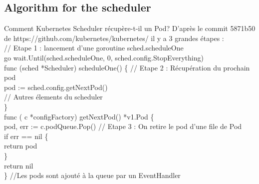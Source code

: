 \documentclass{bredelebeamer}
\begin{document}
\subsection{Algorithm for the scheduler}
\begin{frame}{Comment Kubernetes Scheduler récupère-t-il un Pod?}
D'après le commit 5871b50 de https://github.com/kubernetes/kubernetes/ il y a 3 grandes étapes : 
\vspace{10px} \\

\textcolor{Framavert}{// Etape 1 : lancement d'une goroutine sched.scheduleOne\\}
\textcolor{Framarouge}{go} wait.\textcolor{Framableu}{Until}(sched.scheduleOne, \textcolor{Framableu}{0}, sched.config.StopEverything) \pause
\vspace{10px}\\
\textcolor{Framarouge}{func }\textcolor{Framaviolet}{(}\textcolor{Framaorange}{sched }\textcolor{Framaviolet}{*}\textcolor{Framaorange}{Scheduler}\textcolor{Framaviolet}{)} \textcolor{Framaviolet}{scheduleOne}() \{ \textcolor{Framavert}{// Etape 2  : Récupération du prochain pod} \\
\hspace{10px}	pod \textcolor{Framarouge}{:=} sched.config.\textcolor{Framableu}{getNextPod}() \\
\hspace{10px}    \textcolor{Framavert}{// Autres élements du scheduler}\\
\} \\ \pause
\vspace{10px}
\textcolor{Framarouge}{func} \textcolor{Framaviolet}{(}
\textcolor{Framaorange}{c} \textcolor{Framaviolet}{*}\textcolor{Framaorange}{configFactory}\textcolor{Framaviolet}{) getNextPod()} *\textcolor{Framaorange}{v1.Pod} \{  \\
\hspace{10px}pod, err \textcolor{Framarouge}{:=} c.podQueue.\textcolor{Framableu}{Pop}() \textcolor{Framavert}{// Etape 3 : On retire le pod d'une file de Pod}\\
\hspace{10px}\textcolor{Framaorange}{if} err == \textcolor{Framableu}{nil} \{ \\
\hspace{10px}\hspace{10px}	return pod \\
\hspace{10px}	\} \\
\hspace{10px}	return  \textcolor{Framableu}{nil}\\
\} \pause
\textcolor{Framavert}{//Les pods sont ajouté à la queue par un EventHandler}

\end{frame}
\end{document}
